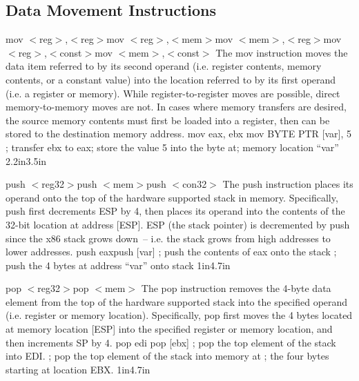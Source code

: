 \subsection{Data Movement Instructions}
\label{data-movement-instructions.sec}

{mov $<$reg$>$,$<$reg$>$\newline mov $<$reg$>$,$<$mem$>$\newline mov $<$mem$>$,$<$reg$>$\newline mov $<$reg$>$,$<$const$>$\newline mov $<$mem$>$,$<$const$>$}
{The mov instruction moves the data item referred to by its second
  operand (i.e.  register contents, memory contents, or a constant
  value) into the location referred to by its first operand (i.e. a
  register or memory). While register-to-register moves are possible,
  direct memory-to-memory moves are not. In cases where memory
  transfers are desired, the source memory contents must first be
  loaded into a register, then can be stored to the destination memory
  address.}
{mov eax, ebx \linebreak mov BYTE PTR [var], 5 }
{; transfer ebx to eax\linebreak; store the value 5 into the byte at\linebreak; memory location ``var''}
{2.2in}{3.5in}

{push $<$reg32$>$\newline push $<$mem$>$\newline push $<$con32$>$}
{The push instruction places its operand onto the top of the hardware supported
stack in memory. Specifically, push first decrements ESP by 4, then places its
operand into the contents of the 32-bit location at address [ESP]. ESP (the stack
pointer) is decremented by push since the x86 stack grows down~-- i.e. the stack
grows from high addresses to lower addresses.}
{push eax\newline push [var]}
{; push the contents of eax onto the stack\newline
; push the 4 bytes at address ``var'' onto stack}
{1in}{4.7in}

{pop $<$reg32$>$\newline pop $<$mem$>$}
{The pop instruction removes the 4-byte data element from the top of
  the hardware supported stack into the specified operand (i.e.
  register or memory location). Specifically, pop first moves the 4
  bytes located at memory location [ESP] into the specified register or
  memory location, and then increments SP by 4.}
{pop edi \newline pop [ebx]}
{; pop the top element of the stack into EDI.\newline
; pop the top element of the stack into memory at\newline
; the four bytes starting at location EBX.}
{1in}{4.7in}

